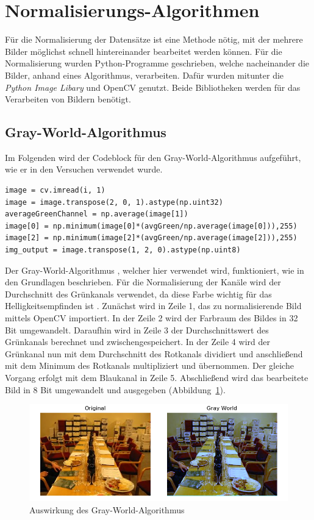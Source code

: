 \section{Normalisierungs-Algorithmen}\label{s.nalgorithmen}
Für die Normalisierung der Datensätze ist eine Methode nötig, mit der mehrere Bilder möglichst schnell hintereinander bearbeitet werden können. Für die Normalisierung wurden Python-Programme geschrieben, welche nacheinander die Bilder, anhand eines Algorithmus, verarbeiten. Dafür wurden mitunter die \textit{Python Image Libary} und OpenCV genutzt. Beide Bibliotheken werden für das Verarbeiten von Bildern benötigt. 
\newpage
\subsection{Gray-World-Algorithmus} 
Im Folgenden wird der Codeblock für den Gray-World-Algorithmus aufgeführt, wie er in den Versuchen verwendet wurde.\\
\begin{lstlisting}
image = cv.imread(i, 1)
image = image.transpose(2, 0, 1).astype(np.uint32)
averageGreenChannel = np.average(image[1])
image[0] = np.minimum(image[0]*(avgGreen/np.average(image[0])),255)
image[2] = np.minimum(image[2]*(avgGreen/np.average(image[2])),255)
img_output = image.transpose(1, 2, 0).astype(np.uint8)
\end{lstlisting}
Der Gray-World-Algorithmus \cite{gray2012world}, welcher hier verwendet wird, funktioniert, wie in den Grundlagen beschrieben. Für die Normalisierung der Kanäle wird der Durchschnitt des Grünkanals verwendet, da diese Farbe wichtig für das Helligkeitsempfinden ist \cite{farbmodell2019uni}. Zunächst wird in Zeile 1, das zu normalisierende Bild mittels OpenCV importiert. In der Zeile 2 wird der Farbraum des Bildes in 32 Bit umgewandelt. Daraufhin wird in Zeile 3 der Durchschnittswert des Grünkanals berechnet und zwischengespeichert. In der Zeile 4 wird der Grünkanal nun mit dem Durchschnitt des Rotkanals dividiert und anschließend mit dem Minimum des Rotkanals multipliziert und übernommen. Der gleiche Vorgang erfolgt mit dem Blaukanal in Zeile 5. Abschließend wird das bearbeitete Bild in 8 Bit umgewandelt und ausgegeben (Abbildung~\ref{img:gwnimg}). 
\begin{figure}
	[h]
	\centering
	\includegraphics[scale=0.6]{Sources/gwn.png}
	\caption{Auswirkung des Gray-World-Algorithmus}
	\label{img:gwnimg}
\end{figure}
\newpage
